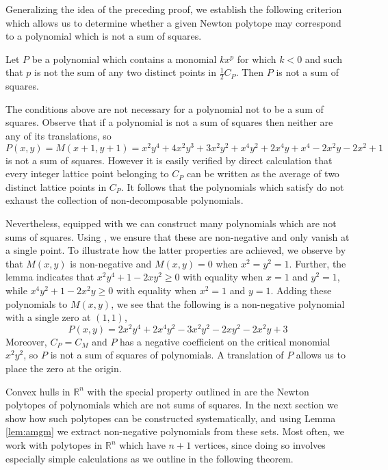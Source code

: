 \documentclass[oneside,hidelinks,indentfirst,10pt]{book}
\begin{document}
Generalizing the idea of the preceding proof, we establish the following criterion which allows us to determine whether a given Newton polytope may correspond to a polynomial which is not a sum of squares.


\begin{cor}\label{cor:hullcond}
Let \(P\) be a polynomial which contains a monomial \(kx^p\) for which \(k<0\)
and such that \(p\) is not the sum of any two distinct points in \(\frac{1}{2}C_P\). Then \(P\) is not a sum of squares. 
\end{cor}


The conditions above are not necessary for a polynomial not to be a sum of squares. Observe that if a polynomial is not a sum of squares then neither are any of its translations, so
\[
    P(x,y)=M(x+1,y+1)=x^2 y^4+4x^2 y^3+3x^2 y^2+x^4 y^2+2x^4 y+x^4-2x^2 y-2x^2+1
\]
is not a sum of squares. However it is easily verified by direct calculation that every integer lattice point belonging to \(C_P\) can be written as the average of two distinct lattice points in \(C_P\). It follows that the polynomials which satisfy  do not exhaust the collection of non-decomposable polynomials. 


Nevertheless, equipped with  we can construct many polynomials which are not sums of squares. Using , we ensure that these are non-negative and only vanish at a single point. To illustrate how the latter properties are achieved, we observe by  that \(M(x,y)\) is non-negative and \(M(x,y)=0\) when \(x^2=y^2=1\). Further, the lemma indicates that \(x^2y^4+1-2xy^2\geq 0\) with equality when \(x=1\) and \(y^2=1\), while \(x^4y^2+1-2x^2y\geq0\) with equality when \(x^2=1\) and \(y=1\). Adding these polynomials to \(M(x,y)\), we see that the following is a non-negative polynomial with a single zero at \((1,1)\),
\[
    P(x,y)=2x^2 y^4+2x^4 y^2-3x^2 y^2-2x y^2-2x^2 y+3
\]
Moreover, \(C_P=C_M\) and \(P\) has a negative coefficient on the critical monomial \(x^2y^2\), so \(P\) is not a sum of squares of polynomials. A translation of \(P\) allows us to place the zero at the origin.


Convex hulls in \(\mathbb{R}^n\) with the special property outlined in  are the Newton polytopes of polynomials which are not sums of squares. In the next section we show how such polytopes can be constructed systematically, and using Lemma \ref{lem:amgm} we extract non-negative polynomials from these sets. Most often, we work with polytopes in \(\mathbb{R}^n\) which have \(n+1\) vertices, since doing so involves especially simple calculations as we outline in the following theorem.
\end{document}
